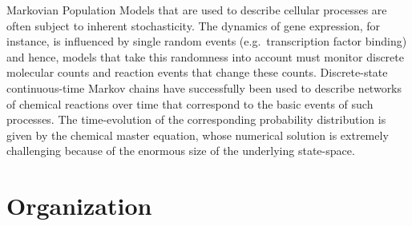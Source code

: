 
Markovian Population Models that are used to describe cellular processes are often subject to inherent stochasticity.
The dynamics of gene expression, for instance, is influenced by 
single random events (e.g.\ transcription factor binding) and 
hence, models that take this randomness into account must monitor
discrete molecular counts and reaction events that change these counts.
Discrete-state continuous-time Markov chains have successfully  been
used to describe  networks of chemical reactions
over time that correspond to the basic events of such processes. 
The time-evolution of the corresponding probability distribution is 
given by the chemical master equation, whose numerical solution is
extremely challenging because of the enormous size of the underlying
state-space. 

\section{Organization}


